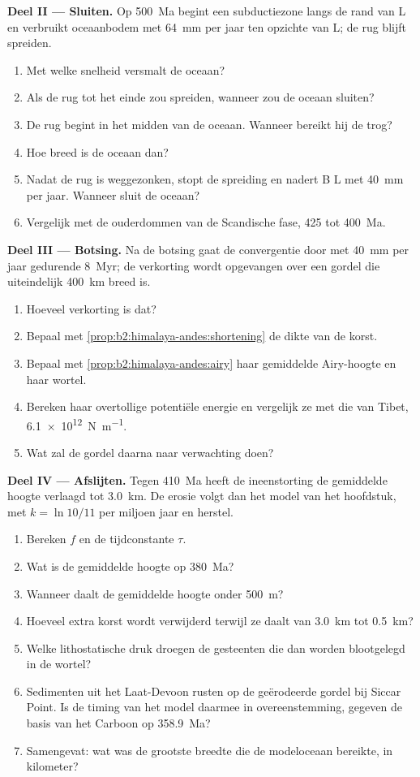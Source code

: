 \begin{problem}
\noindent\textbf{Deel II --- Sluiten.} Op \qty{500}{Ma} begint een subductiezone langs de
rand van L en verbruikt oceaanbodem met \qty{64}{mm} per jaar ten opzichte van L; de rug blijft
spreiden.
\begin{enumerate}[resume]
\item Met welke snelheid versmalt de oceaan?
\item Als de rug tot het einde zou spreiden, wanneer zou de oceaan sluiten?
\item De rug begint in het midden van de oceaan. Wanneer bereikt hij de trog?
\item Hoe breed is de oceaan dan?
\item Nadat de rug is weggezonken, stopt de spreiding en nadert B L met \qty{40}{mm} per
jaar. Wanneer sluit de oceaan?
\item Vergelijk met de ouderdommen van de Scandische fase, 425 tot \qty{400}{Ma}.
\end{enumerate}

\noindent\textbf{Deel III --- Botsing.} Na de botsing gaat de convergentie door met
\qty{40}{mm} per jaar gedurende \qty{8}{Myr}; de verkorting wordt opgevangen over een gordel die uiteindelijk
\qty{400}{km} breed is.
\begin{enumerate}[resume]
\item Hoeveel verkorting is dat?
\item Bepaal met \cref{prop:b2:himalaya-andes:shortening} de dikte van de korst.
\item Bepaal met \cref{prop:b2:himalaya-andes:airy} haar gemiddelde Airy-hoogte en haar wortel.
\item Bereken haar overtollige potentiële energie en vergelijk ze met die van Tibet,
\qty{6.1e12}{N.m^{-1}}.
\item Wat zal de gordel daarna naar verwachting doen?
\end{enumerate}

\noindent\textbf{Deel IV --- Afslijten.} Tegen \qty{410}{Ma} heeft de ineenstorting de gemiddelde
hoogte verlaagd tot \qty{3.0}{km}. De erosie volgt dan het model van het hoofdstuk, met $k = \ln
10/11$ per miljoen jaar en herstel.
\begin{enumerate}[resume]
\item Bereken $f$ en de tijdconstante $\tau$.
\item Wat is de gemiddelde hoogte op \qty{380}{Ma}?
\item Wanneer daalt de gemiddelde hoogte onder \qty{500}{m}?
\item Hoeveel extra korst wordt verwijderd terwijl ze daalt van \qty{3.0}{km} tot \qty{0.5}{km}?
\item Welke lithostatische druk droegen de gesteenten die dan worden blootgelegd in de wortel?
\item Sedimenten uit het Laat-Devoon rusten op de geërodeerde gordel bij Siccar Point. Is de timing van het model
daarmee in overeenstemming, gegeven de basis van het Carboon op \qty{358.9}{Ma}?
\item Samengevat: wat was de grootste breedte die de modeloceaan bereikte, in kilometer?
\end{enumerate}
\end{problem}
